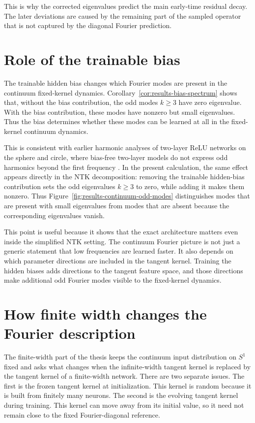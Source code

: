 This is why the corrected eigenvalues predict the main early-time residual
decay. The later deviations are caused by the remaining part of the sampled
operator that is not captured by the diagonal Fourier prediction.

\section{Role of the trainable bias}
\label{sec:discussion-bias}

The trainable hidden bias changes which Fourier modes are present in the
continuum fixed-kernel dynamics. Corollary~\ref{cor:results-bias-spectrum}
shows that, without the bias contribution, the odd modes \(k\ge 3\) have zero
eigenvalue. With the bias contribution, these modes have nonzero but small
eigenvalues. Thus the bias determines whether these modes can be learned at all
in the fixed-kernel continuum dynamics.

This is consistent with earlier harmonic analyses of two-layer ReLU networks on
the sphere and circle, where bias-free two-layer models do not express odd
harmonics beyond the first frequency
\citep{basri2019convergence,basri2020frequencybiasneuralnetworks}. In the
present calculation, the same effect appears directly in the NTK decomposition:
removing the trainable hidden-bias contribution sets the odd eigenvalues
\(k\ge 3\) to zero, while adding it makes them nonzero. Thus
Figure~\ref{fig:results-continuum-odd-modes} distinguishes modes that are
present with small eigenvalues from modes that are absent because the
corresponding eigenvalues vanish.

This point is useful because it shows that the exact architecture matters even
inside the simplified NTK setting. The continuum Fourier picture is not just a
generic statement that low frequencies are learned faster. It also depends on
which parameter directions are included in the tangent kernel. Training the
hidden biases adds directions to the tangent feature space, and those directions
make additional odd Fourier modes visible to the fixed-kernel dynamics.

\section{How finite width changes the Fourier description}
\label{sec:discussion-finite-width}

The finite-width part of the thesis keeps the continuum input distribution on
\(S^1\) fixed and asks what changes when the infinite-width tangent kernel is
replaced by the tangent kernel of a finite-width network. There are two
separate issues. The first is the frozen tangent kernel at initialization. This
kernel is random because it is built from finitely many neurons. The second is
the evolving tangent kernel during training. This kernel can move away from its
initial value, so it need not remain close to the fixed Fourier-diagonal
reference.

